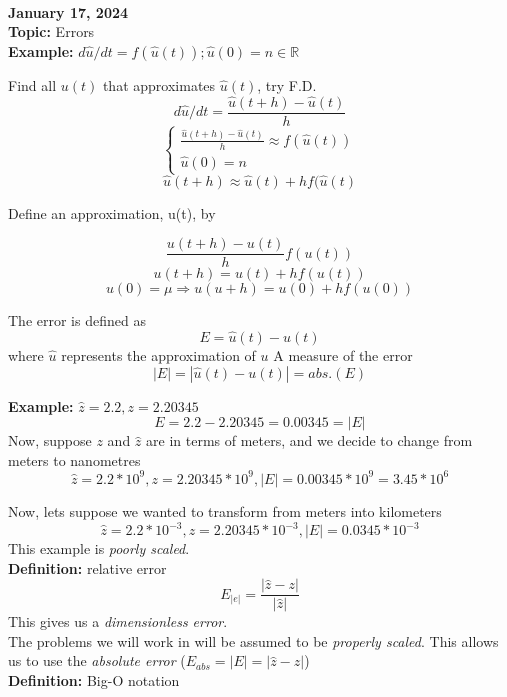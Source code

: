 \documentclass[10pt, AMS Euler]{article}
\newcommand{\R}{\mathbb{R}}
\begin{document}
\noindent \underline{\hspace{3in}}\\

\textbf{January 17, 2024}\\

\textbf{Topic:} Errors\\

\textbf{Example:} $d\hat{u}/dt = f(\hat{u}(t)); \hat{u}(0) = n \in \R$

Find all $u(t)$ that approximates $\hat{u}(t)$, try F.D.\\

\[d\hat{u}/dt = \frac{\hat{u}(t + h) - \hat{u}(t)}{h}\]
\[
    \begin{cases}
        \frac{\hat{u}(t + h) - \hat{u}(t)}{h} \approx f(\hat{u}(t))\\
         \hat{u}(0) = n
     \end{cases}
\]
\[\hat{u}(t + h) \approx \hat{u}(t) + hf(\hat{u}(t)\]

Define an approximation, u(t), by

\[\frac{u(t + h) - u(t)}{h} f(u(t))\]
\[u(t + h) = u(t) + hf(u(t))\]
\[u(0) = \mu \Rightarrow u(u + h) = u(0) + hf(u(0))\]

The error is defined as
\[E = \hat{u}(t) - u(t)\]
where $\hat{u}$ represents the approximation of $u$
A measure of the error
\[|E| = |\hat{u}(t) - u(t)| = abs.(E)\]

\textbf{Example:} $\hat{z} = 2.2, z = 2.20345$\\
\[E = 2.2 - 2.20345 = 0.00345 = |E|\]
Now, suppose $z$ and $\hat{z}$ are in terms of meters, and we decide to change from meters to nanometres
\[\hat{z} = 2.2 * 10^{9}, z = 2.20345 * 10^{9}, |E| = 0.00345 * 10^9 = 3.45 * 10^6 \]

Now, lets suppose we wanted to transform from meters into kilometers
\[\hat{z} = 2.2 * 10^{-3}, z = 2.20345 * 10^{-3}, |E| = 0.0345 * 10^{-3}\]
This example is \textit{poorly scaled}.\\

\textbf{Definition:} relative error
\[E_{|e|} = \frac{|\hat{z} - z|}{|\hat{z}|}\]
This gives us a \textit{dimensionless error}.\\

The problems we will work in will be assumed to be \textit{properly scaled}. This allows us to use the \textit{absolute error} ($E_{abs} = |E| = |\hat{z} - z|$)\\

\textbf{Definition:} Big-O notation\\
\end{document}
